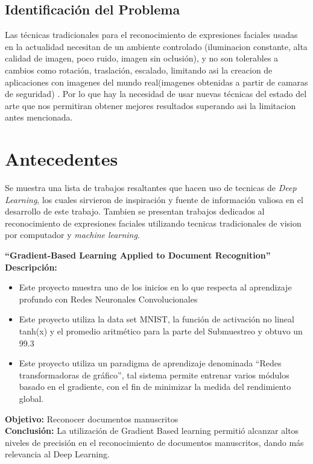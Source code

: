 \subsection{Identificación del Problema}
Las técnicas tradicionales para el reconocimiento de expresiones faciales usadas en la actualidad necesitan de un ambiente controlado (iluminacion constante, alta calidad de imagen, poco ruido, imagen sin oclusión), y no son tolerables a cambios como rotación, traslación, escalado, limitando asi la creacion de aplicaciones con imagenes del mundo real(imagenes obtenidas a partir de camaras de seguridad) . Por lo que hay la necesidad de usar nuevas técnicas del estado del arte que nos permitiran obtener mejores resultados superando asi la limitacion antes mencionada.

\section{Antecedentes}
Se muestra una lista de trabajos resaltantes que hacen uso de tecnicas de \textit{Deep Learning}, los cuales sirvieron de inspiración y fuente de información valiosa en el desarrollo de este trabajo. Tambien se presentan trabajos dedicados al reconocimiento de expresiones faciales utilizando tecnicas tradicionales de vision por computador y \textit{machine learning}.

\vspace{1cm}
\textbf{“Gradient-Based Learning Applied to Document Recognition” \cite{2lecun1998gradient}}\\
\textbf{Descripción:}\\

\begin{itemize}
\item Este proyecto muestra uno de los inicios en lo que respecta al aprendizaje profundo con Redes Neuronales Convolucionales
\item Este proyecto utiliza la data set MNIST, la función de activación no lineal tanh(x) y el promedio aritmético para la parte del Submuestreo y obtuvo un 99.3%
\item Este proyecto utiliza un paradigma de aprendizaje denominada “Redes transformadoras de gráfico”, tal sistema permite entrenar varios módulos basado en el gradiente, con el fin de minimizar la medida del rendimiento global.
\end{itemize}
\textbf{Objetivo:} Reconocer documentos manuscritos\\
\textbf{Conclusión:} La utilización de Gradient Based learning permitió alcanzar altos niveles de precisión en el reconocimiento de documentos manuscritos, dando más relevancia al Deep Learning.\\


